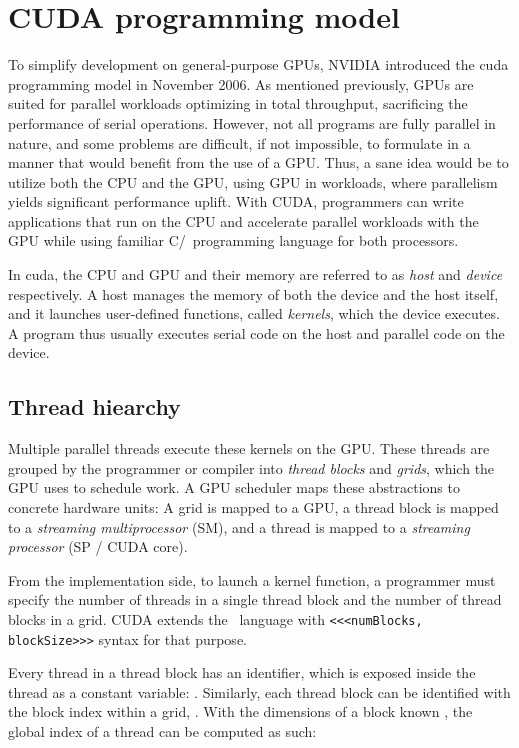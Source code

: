 \section{CUDA programming model} \label{label:cuda}

To simplify development on general-purpose GPUs, NVIDIA introduced the \acrfull{cuda} programming model in November 2006. As mentioned previously, GPUs are suited for parallel workloads optimizing in total throughput, sacrificing the performance of serial operations. However, not all programs are fully parallel in nature, and some problems are difficult, if not impossible, to formulate in a manner that would benefit from the use of a GPU. Thus, a sane idea would be to utilize both the CPU and the GPU, using GPU in workloads, where parallelism yields significant performance uplift. With CUDA, programmers can write applications that run on the CPU and accelerate parallel workloads with the GPU while using familiar C/\CC\ programming language for both processors.

In \acrshort{cuda}, the CPU and GPU and their memory are referred to as \textit{host} and \textit{device} respectively. A host manages the memory of both the device and the host itself, and it launches user-defined functions, called \textit{kernels}, which the device executes. A program thus usually executes serial code on the host and parallel code on the device.

\subsection{Thread hiearchy}

Multiple parallel threads execute these kernels on the GPU. These threads are grouped by the programmer or compiler into \textit{thread blocks} and \textit{grids}, which the GPU uses to schedule work. A GPU scheduler maps these abstractions to concrete hardware units: A grid is mapped to a GPU, a thread block is mapped to a \textit{streaming multiprocessor} (SM), and a thread is mapped to a \textit{streaming processor} (SP / CUDA core).

From the implementation side, to launch a kernel function, a programmer must specify the number of threads in a single thread block and the number of thread blocks in a grid. CUDA extends the \CC\ language with \texttt{<<<numBlocks, blockSize>>>} syntax for that purpose.

Every thread in a thread block has an identifier, which is exposed inside the thread as a constant variable: . Similarly, each thread block can be identified with the block index within a grid, . With the dimensions of a block known , the global index of a thread can be computed as such:

